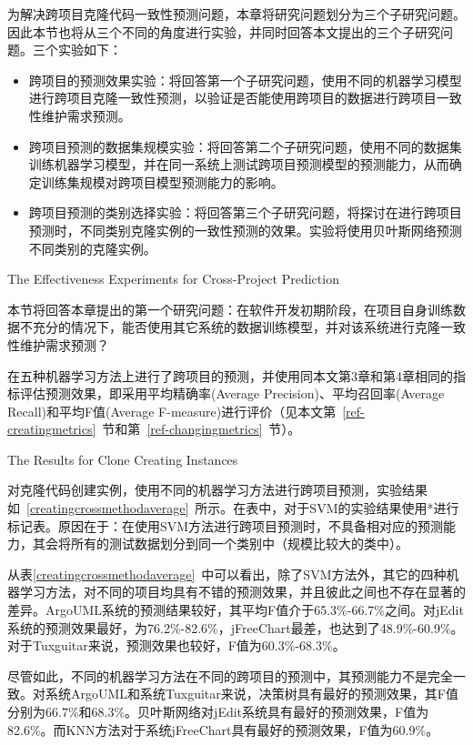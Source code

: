 为解决跨项目克隆代码一致性预测问题，本章将研究问题划分为三个子研究问题。因此本节也将从三个不同的角度进行实验，并同时回答本文提出的三个子研究问题。三个实验如下：
\begin{itemize}
\item
跨项目的预测效果实验：将回答第一个子研究问题，使用不同的机器学习模型进行跨项目克隆一致性预测，以验证是否能使用跨项目的数据进行跨项目一致性维护需求预测。
\item
跨项目预测的数据集规模实验：将回答第二个子研究问题，使用不同的数据集训练机器学习模型，并在同一系统上测试跨项目预测模型的预测能力，从而确定训练集规模对跨项目模型预测能力的影响。
\item
跨项目预测的类别选择实验：将回答第三个子研究问题，将探讨在进行跨项目预测时，不同类别克隆实例的一致性预测的效果。实验将使用贝叶斯网络预测不同类别的克隆实例。
\end{itemize}

{The Effectiveness Experiments for Cross-Project Prediction}

本节将回答本章提出的第一个研究问题：在软件开发初期阶段，在项目自身训练数据不充分的情况下，能否使用其它系统的数据训练模型，并对该系统进行克隆一致性维护需求预测？

在五种机器学习方法上进行了跨项目的预测，并使用同本文第3章和第4章相同的指标评估预测效果，即采用平均精确率(Average Precision)、平均召回率(Average Recall)和平均F值(Average F-measure)进行评价（见本文第~\ref{ref-creatingmetrics}~节和第~\ref{ref-changingmetrics}~节）。

{The Results for Clone Creating Instances}

对克隆代码创建实例，使用不同的机器学习方法进行跨项目预测，实验结果如~\ref{creatingcrossmethodaverage}~所示。在表中，对于SVM的实验结果使用{*}进行标记表。原因在于：在使用SVM方法进行跨项目预测时，不具备相对应的预测能力，其会将所有的测试数据划分到同一个类别中（规模比较大的类中）。

从表\ref{creatingcrossmethodaverage}~中可以看出，除了SVM方法外，其它的四种机器学习方法，对不同的项目均具有不错的预测效果，并且彼此之间也不存在显著的差异。ArgoUML系统的预测结果较好，其平均F值介于65.3\%-66.7\%之间。对jEdit系统的预测效果最好，为76.2\%-82.6\%，jFreeChart最差，也达到了48.9\%-60.9\%。对于Tuxguitar来说，预测效果也较好，F值为60.3\%-68.3\%。

尽管如此，不同的机器学习方法在不同的跨项目的预测中，其预测能力不是完全一致。对系统ArgoUML和系统Tuxguitar来说，决策树具有最好的预测效果，其F值分别为66.7\%和68.3\%。贝叶斯网络对jEdit系统具有最好的预测效果，F值为82.6\%。而KNN方法对于系统jFreeChart具有最好的预测效果，F值为60.9\%。

